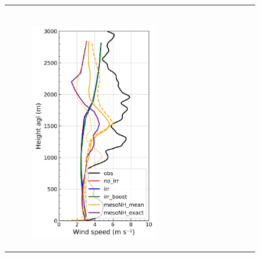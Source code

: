\begin{figure}[hbtp]
{\begin{tabular}{@{}cccc@{}}
\begin{subfigure}[t]{0.283\textwidth}
        \end{subfigure} \\
        \begin{subfigure}[t]{0.382\textwidth}
            \caption{}
            \includegraphics[width=\textwidth]{images/chap6/profiles/profile_elsplans_wind_speed_1507_sensbins.png}
        \end{subfigure} &
        \begin{subfigure}[t]{0.283\textwidth}
            \caption{}

\end{subfigure}
\end{tabular}}
\end{figure}

